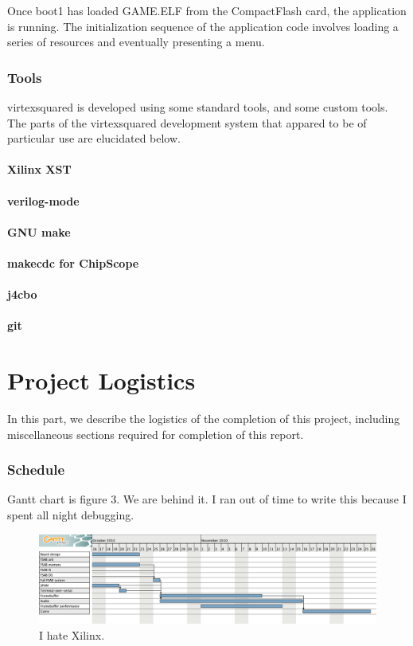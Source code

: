 \documentclass[10pt]{article}
\begin{document}
Once boot1 has loaded GAME.ELF from the CompactFlash card, the application
is running. The initialization sequence of the application code involves
loading a series of resources and eventually presenting a menu.

\section{Tools}

virtexsquared is developed using some standard tools, and some custom tools. 
The parts of the virtexsquared development system that appared to be of
particular use are elucidated below.

\subsection{Xilinx XST}

\subsection{verilog-mode}

\subsection{GNU make}

\subsection{makecdc for ChipScope}

\subsection{j4cbo}

\subsection{git}

\part{Project Logistics}

In this part, we describe the logistics of the completion of this project,
including miscellaneous sections required for completion of this report.

\section{Schedule}

Gantt chart is figure 3.  We are behind it.  I ran out of time to write
this because I spent all night debugging.

\begin{figure}
  \centering
    \includegraphics[width=\textwidth]{gantt-chart.png}
  \caption{I hate Xilinx.} \label{mshim_clock}
\end{figure}
\end{document}

